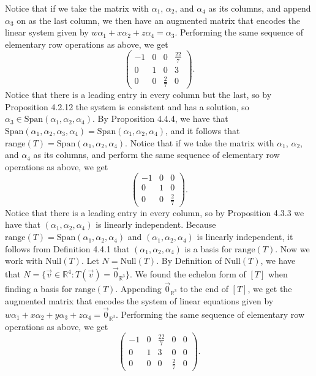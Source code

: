 \documentclass[12pt]{article}
\begin{document}
%
%
%
%
\newpage
Notice that if we take the matrix with $\alpha_1$, $\alpha_2$, and $\alpha_4$ as its columns, and append $\alpha_3$ on as the last column, we then have an augmented matrix that encodes the linear system given by $w\alpha_1 + x\alpha_2 + z\alpha_4 = \alpha_3$. Performing the same sequence of elementary row operations as above, we get
\[
\begin{pmatrix} -1&0&0&\frac{22}{7}\\0&1&0&3\\0&0&\frac{2}{7}&0 \end{pmatrix} \text{.}
\]
Notice that there is a leading entry in every column but the last, so by Proposition 4.2.12 the system is consistent and has a solution, so $\alpha_3 \in \text{Span}(\alpha_1,\alpha_2,\alpha_4)$. By Proposition 4.4.4, we have that $\text{Span}(\alpha_1,\alpha_2,\alpha_3,\alpha_4)=\text{Span}(\alpha_1,\alpha_2,\alpha_4)$, and it follows that $\text{range}(T)=\text{Span}(\alpha_1,\alpha_2,\alpha_4)$. Notice that if we take the matrix with $\alpha_1$, $\alpha_2$, and $\alpha_4$ as its columns, and perform the same sequence of elementary row operations as above, we get
\[
\begin{pmatrix} -1&0&0\\0&1&0\\0&0&\frac{2}{7} \end{pmatrix} \text{.}
\]
Notice that there is a leading entry in every column, so by Proposition 4.3.3 we have that $(\alpha_1,\alpha_2,\alpha_4)$ is linearly independent. Because $\text{range}(T)=\text{Span}(\alpha_1,\alpha_2,\alpha_4)$ and $(\alpha_1,\alpha_2,\alpha_4)$ is linearly independent, it follows from Definition 4.4.1 that $(\alpha_1,\alpha_2,\alpha_4)$ is a basis for $\text{range}(T)$.
\newline
\newline
\noindent
Now we work with $\text{Null}(T)$. Let $N =\text{Null}(T)$. By Definition of $\text{Null}(T)$, we have that $N=\{ \vec{v} \in \mathbb{R}^4: T(\vec{v})=\vec{0}_{\mathbb{R}^3}\}$. We found the echelon form of $[T]$ when finding a basis for $\text{range}(T)$. Appending $\vec{0}_{\mathbb{R}^3}$ to the end of $[T]$, we get the augmented matrix that encodes the system of linear equations given by $w\alpha_1+x\alpha_2+y\alpha_3+z\alpha_4 = \vec{0}_{\mathbb{R}^3}$. Performing the same sequence of elementary row operations as above, we get
\[
\begin{pmatrix} -1&0&\frac{22}{7}&0&0\\0&1&3&0&0\\0&0&0&\frac{2}{7}&0 \end{pmatrix} \text{.}
\]
\end{document}
